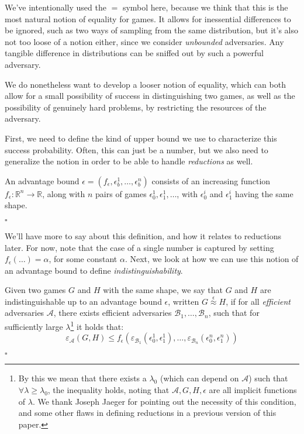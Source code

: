 We've intentionally used the $=$ symbol here, because we think that
this is the most natural notion of equality for games.
It allows for inessential differences to be ignored,
such as two ways of sampling from the same distribution,
but it's also not too loose of a notion either, since we consider
\emph{unbounded} adversaries.
Any tangible difference in distributions can be sniffed out by
such a powerful adversary.

We do nonetheless want to develop a looser notion of equality,
which can both allow for a small possibility of success
in distinguishing two games, as well as the possibility of genuinely
hard problems, by restricting the resources of the adversary.

First, we need to define the kind of upper bound we use
to characterize this success probability.
Often, this can just be a number, but we also need to generalize
the notion in order to be able to handle \emph{reductions} as well.

\begin{definition}
    An advantage bound $\epsilon = (f_\epsilon, \epsilon_b^1, \ldots, \epsilon_b^n)$
    consists of an increasing function $f_\epsilon : \mathbb{R}^n \to \mathbb{R}$,
    along with $n$ pairs of games $\epsilon^1_0, \epsilon^1_1, \ldots$, with
    $\epsilon^i_0$ and $\epsilon^i_1$ having the same shape.

    $\square$
\end{definition}

We'll have more to say about this definition, and how it relates to reductions
later.
For now, note that the case of a single number is captured by setting
$f_\epsilon(\ldots) = \alpha$, for some constant $\alpha$.
Next, we look at how we can use this notion of an advantage bound
to define \emph{indistinguishability}.

\begin{definition}
    Given two games $G$ and $H$ with the same shape,
    we say that $G$ and $H$ are indistinguishable up to an advantage bound $\epsilon$,
    written ${G \overset{\epsilon}{\approx} H}$, if for all \emph{efficient}
    adversaries $\mathcal{A}$, there exists efficient adversaries $\mathcal{B}_1, \ldots, \mathcal{B}_n$, such that for sufficiently large $\lambda$\footnote{
        By this we mean that there exists a $\lambda_0$ (which can depend on $\mathcal{A}$) such that $\forall \lambda \geq \lambda_0$, the inequality holds, noting that $\mathcal{A}, G, H, \epsilon$ are all implicit functions of $\lambda$.
        We thank Joseph Jaeger for pointing out the necessity of this condition,
        and some other flaws in defining reductions in a previous version of this paper.
    } it holds that:
    $$
    \varepsilon_{\mathcal{A}}(G, H) \leq f_\epsilon(\varepsilon_{\mathcal{B}_1}(\epsilon^1_0, \epsilon^1_1), \ldots, \varepsilon_{\mathcal{B}_n}(\epsilon^n_0, \epsilon^n_1))
    $$

    $\square$
\end{definition}

